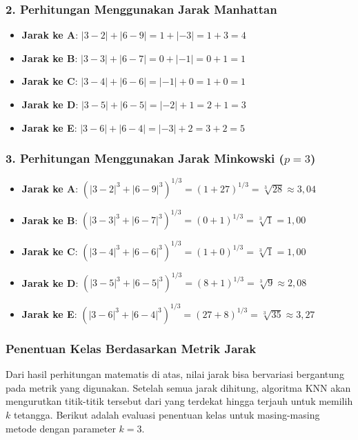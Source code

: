 \subsubsection*{2. Perhitungan Menggunakan Jarak Manhattan}
\begin{itemize}
    \item \textbf{Jarak ke A}: $|3 - 2| + |6 - 9| = 1 + |-3| = 1 + 3 = 4$
    \item \textbf{Jarak ke B}: $|3 - 3| + |6 - 7| = 0 + |-1| = 0 + 1 = 1$
    \item \textbf{Jarak ke C}: $|3 - 4| + |6 - 6| = |-1| + 0 = 1 + 0 = 1$
    \item \textbf{Jarak ke D}: $|3 - 5| + |6 - 5| = |-2| + 1 = 2 + 1 = 3$
    \item \textbf{Jarak ke E}: $|3 - 6| + |6 - 4| = |-3| + 2 = 3 + 2 = 5$
\end{itemize}

\subsubsection*{3. Perhitungan Menggunakan Jarak Minkowski ($p=3$)}
\begin{itemize}
    \item \textbf{Jarak ke A}: $(|3 - 2|^3 + |6 - 9|^3)^{1/3} = (1 + 27)^{1/3} = \sqrt[3]{28} \approx 3{,}04$
    \item \textbf{Jarak ke B}: $(|3 - 3|^3 + |6 - 7|^3)^{1/3} = (0 + 1)^{1/3} = \sqrt[3]{1} = 1{,}00$
    \item \textbf{Jarak ke C}: $(|3 - 4|^3 + |6 - 6|^3)^{1/3} = (1 + 0)^{1/3} = \sqrt[3]{1} = 1{,}00$
    \item \textbf{Jarak ke D}: $(|3 - 5|^3 + |6 - 5|^3)^{1/3} = (8 + 1)^{1/3} = \sqrt[3]{9} \approx 2{,}08$
    \item \textbf{Jarak ke E}: $(|3 - 6|^3 + |6 - 4|^3)^{1/3} = (27 + 8)^{1/3} = \sqrt[3]{35} \approx 3{,}27$
\end{itemize}

\subsubsection{Penentuan Kelas Berdasarkan Metrik Jarak}
Dari hasil perhitungan matematis di atas, nilai jarak bisa bervariasi bergantung pada metrik yang digunakan. Setelah semua jarak dihitung, algoritma KNN akan mengurutkan titik-titik tersebut dari yang terdekat hingga terjauh untuk memilih $k$ tetangga. Berikut adalah evaluasi penentuan kelas untuk masing-masing metode dengan parameter $k = 3$.

